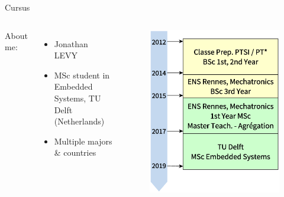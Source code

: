 
\begin{frame}{Cursus}
	\begin{columns}
		\begin{center}
			About me:
		\end{center}
			\begin{itemize}
				\item Jonathan LEVY
				\item MSc student in Embedded Systems, TU Delft (Netherlands)
				\item Multiple majors \& countries
			\end{itemize}

		\begin{figure}
			\centering
			\includegraphics[width=0.7\linewidth]{timeline_studies}
		\end{figure}
	\end{columns}
\end{frame}